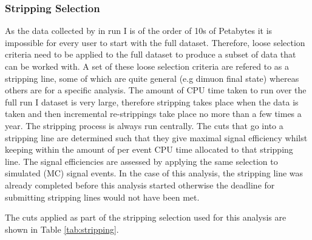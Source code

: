 \subsubsection{Stripping Selection}
\label{sec:Stripping}
As the data collected by \lhcb in run I is of the order of 10s of Petabytes it is impossible for every user to start with the full dataset.  Therefore, loose selection criteria need to be applied to the full dataset to produce a subset of data that can be worked with.  A set of these loose selection criteria are refered to as a stripping line, some of which are quite general (e.g dimuon final state) whereas others are for a specific analysis.  The amount of CPU time taken to run over the full run I dataset is very large, therefore stripping takes place when the data is taken and then incremental re-strippings take place no more than a few times a year.  The stripping process is always run centrally.
The cuts that go into a stripping line are determined such that they give maximal signal efficiency whilst keeping within the amount of per event CPU time allocated to that stripping line.  The signal efficiencies are assessed by applying the same selection to simulated (MC) signal events.  In the case of this analysis, the stripping line was already completed before this analysis started otherwise the deadline for submitting stripping lines would not have been met.

The cuts applied as part of the stripping selection used for this analysis are shown in Table \ref{tab:stripping}.

